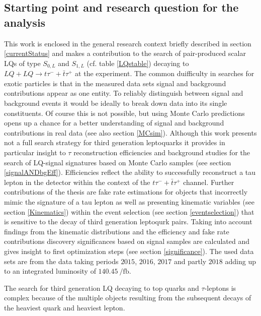 \subsection{Starting point and research question for the analysis}\label{startingpoint}
This work is enclosed in the general research context briefly described in section \ref{currentStatus} and makes a contribution to the search of pair-produced scalar LQs of type $S_{0,L}$ and $S_{1,L}$ (cf. table \ref{LQstable}) decaying to $LQ+LQ\rightarrow t\tau^{-}+\bar{t}\tau^{+}$ at the {\ATLAS} experiment. The common duifficulty in searches for exotic particles is that in the measured data sets signal and background contributions appear as one entity. To reliably distinguish between signal and background events it would be ideally to break down data into its single constituents. Of course this is not possible, but using Monte Carlo predictions opens up a chance for a better understanding of signal and background contributions in real data (see also section \ref{MCsim}). Although this work presents not a full search strategy for third generation leptoquarks it provides in particular insight to $\tau$ reconstruction efficiencies and background studies for the search of LQ-signal signatures based on Monte Carlo samples (see section \ref{signalANDbgEff}). Efficiencies reflect the ability to successfully reconstruct a tau lepton in the detector within the context of the $t\tau^{-}+\bar{t}\tau^{+}$ channel. Further contributions of the thesis are fake rate estimations for objects that incorrectly mimic the signature of a tau lepton as well as presenting kinematic variables (see section \ref{Kinematics}) within the event selection (see section \ref{eventselection}) that is sensitive to the decay of third generation leptoqurk pairs. Taking into account findings from the kinematic distributions and the efficiency and fake rate contributions discovery significances based on signal samples are calculated and gives insight to first optimization steps (see section \ref{significance}). The used data sets are from the data taking periods $2015$, $2016$, $2017$ and partly $2018$ adding up to an integrated luminosity of $\SI{140.45}{\per\femto\barn}$.\par   
The search for third generation LQ decaying to top quarks and $\tau$-leptons is complex because of the multiple objects resulting from the subsequent decays of the heaviest quark and heaviest lepton. 
%
%
